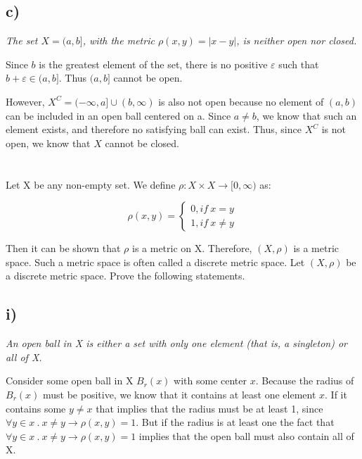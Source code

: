 \documentclass[]{article}
\begin{document}
			\subsection*{c)} \textit{The set $X = (a, b]$, with the metric $\rho(x, y) = |x - y|$, is neither open nor closed.}


			Since $b$ is the greatest element of the set, there is no positive $\varepsilon$ such that $b + \varepsilon \in (a, b]$. Thus $(a, b]$ cannot be open. 

			However, $X^C = (-\infty, a] \cup (b, \infty)$ is also not open because no element of $(a, b)$ can be included in an open ball centered on a. Since $a \neq b$, we know that such an element exists, and therefore no satisfying ball can exist. Thus, since $X^C$ is not open, we know that $X$ cannot be closed. 

	\section{}
		\begin{em}
			Let X be any non-empty set. We define $\rho : X \times X \to [0, \infty)$ as: 

			\[
				\rho(x, y) = \begin{cases}
					0, if\ x = y \\
					1, if\ x \neq y
				\end{cases}
			\]

			Then it can be shown that $\rho$ is a metric on X. Therefore, $(X, \rho)$ is a metric space. Such a metric space is often called a discrete metric space. Let $(X, \rho)$ be a discrete metric space. Prove the following statements. 
		\end{em}

		\subsection*{i)}
			\textit{An open ball in X is either a set with only one element (that is, a singleton) or all of X.}

			Consider some open ball in X $B_r(x)$ with some center $x$. Because the radius of $B_r(x)$ must be positive, we know that it contains at least one element $x$. If it contains some $y \neq x$ that implies that the radius must be at least 1, since $\forall y \in x\ .\ x \neq y \to \rho(x, y) = 1$. But if the radius is at least one the fact that $\forall y \in x\ .\ x \neq y \to \rho(x, y) = 1$ implies that the open ball must also contain all of X. 
\end{document}
